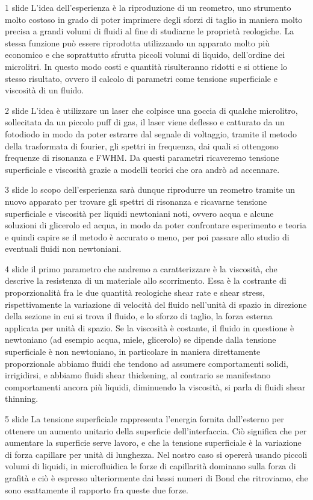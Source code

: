 1 slide
L'idea dell'esperienza è la riproduzione di un reometro, uno strumento molto costoso 
in grado di poter imprimere degli sforzi di taglio in maniera molto precisa a grandi volumi di fluidi al fine di studiarne le proprietà reologiche. La stessa funzione può essere riprodotta utilizzando un apparato molto più economico e che soprattutto sfrutta piccoli volumi di liquido, dell'ordine dei microlitri. In questo modo costi e quantità risulteranno ridotti e si ottiene lo stesso risultato, ovvero il calcolo di parametri come tensione superficiale e viscosità di un fluido.

2 slide
L'idea è utilizzare un laser che colpisce una goccia di qualche microlitro, sollecitata da un piccolo puff di gas, il laser viene deflesso e catturato da un fotodiodo in modo da poter estrarre dal segnale di voltaggio, tramite il metodo della trasformata di fourier, gli spettri in frequenza, dai quali si ottengono frequenze di risonanza e FWHM. Da questi parametri ricaveremo tensione superficiale e viscosità grazie a modelli teorici che ora andrò ad accennare.

3 slide 
lo scopo dell'esperienza sarà dunque riprodurre un reometro tramite un nuovo apparato per trovare gli spettri di risonanza e ricavarne tensione superficiale e viscosità per liquidi newtoniani noti, ovvero acqua e alcune soluzioni di glicerolo ed acqua, in modo da poter confrontare esperimento e teoria e quindi capire se il metodo è accurato o meno, per poi passare allo studio di eventuali fluidi non newtoniani.

4 slide 
il primo parametro che andremo a caratterizzare è la viscosità, che descrive la resistenza di un materiale allo scorrimento. Essa è la costrante di proporzionalità fra le due quantità reologiche shear rate e shear stress, rispettivamente la variazione di velocità del fluido nell'unità di spazio in direzione della sezione in cui si trova il fluido, e lo sforzo di taglio, la forza esterna applicata per unità di spazio. Se la viscosità è costante, il fluido in questione è newtoniano (ad esempio acqua, miele, glicerolo) se dipende dalla tensione superficiale è non newtoniano, in particolare in maniera direttamente proporzionale abbiamo fluidi che tendono ad assumere comportamenti solidi, irrigidirsi, e abbiamo fluidi shear thickening, al contrario se manifestano comportamenti ancora più liquidi, diminuendo la viscosità, si parla di fluidi shear thinning.

5 slide
La tensione superficiale rappresenta l'energia fornita dall'esterno per ottenere un aumento unitario della superficie dell'interfaccia. Ciò significa che per aumentare la superficie serve lavoro, e che la tensione superficiale è la variazione di forza capillare per unità di lunghezza. Nel nostro caso si opererà usando piccoli volumi di liquidi, in microfluidica le forze di capillarità dominano sulla forza di grafità e ciò è espresso ulteriormente dai bassi numeri di Bond che ritroviamo, che sono esattamente il rapporto fra queste due forze.

